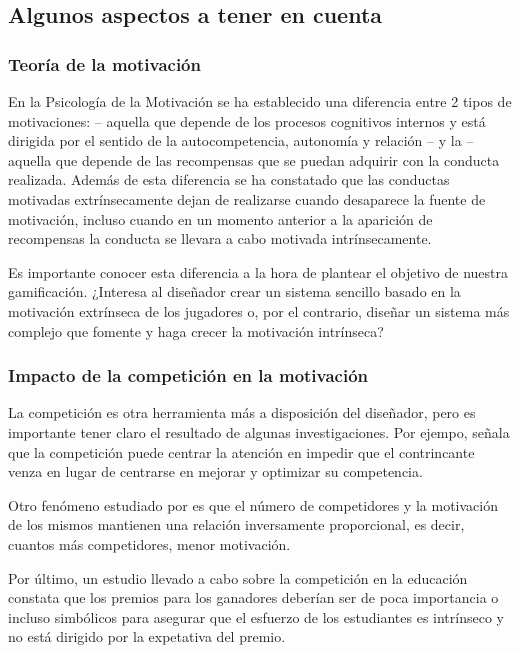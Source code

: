 \subsection{Algunos aspectos a tener en cuenta}

\subsubsection{Teoría de la motivación}
\label{SDT}
En la Psicología de la Motivación se ha establecido una diferencia entre 2 tipos de motivaciones\cite{SDT}:   -- aquella que depende de los procesos cognitivos internos y está dirigida por el sentido de la autocompetencia, autonomía y relación -- y la  -- aquella que depende de las recompensas que se puedan adquirir con la conducta realizada.
%
Además de esta diferencia se ha constatado que las conductas motivadas extrínsecamente dejan de realizarse cuando desaparece la fuente de motivación, incluso cuando en un momento anterior a la aparición de recompensas la conducta se llevara a cabo motivada intrínsecamente.

Es importante conocer esta diferencia a la hora de plantear el objetivo de nuestra gamificación. 
%
¿Interesa al diseñador crear un sistema sencillo basado en la motivación extrínseca de los jugadores o, por el contrario, diseñar un sistema más complejo que fomente y haga crecer la motivación intrínseca?



\subsubsection{Impacto de la competición en la motivación}

\label{PosiblesPeligros}
%
La competición es otra herramienta más a disposición del diseñador, pero es importante tener claro el resultado de algunas investigaciones.
%
Por ejempo, \cite{Crawford_CompetitionDef} señala que la competición puede centrar la atención en impedir que el contrincante venza en lugar de centrarse en mejorar y optimizar su competencia.
%

Otro fenómeno estudiado por \cite{n-effect} es que el número de competidores y la motivación de los mismos mantienen una relación inversamente proporcional, es decir, cuantos más competidores, menor motivación.

Por último, un estudio llevado a cabo sobre la competición en la educación \cite{CompetitionInEd} constata que los premios para los ganadores deberían ser de poca importancia o incluso simbólicos para asegurar que el esfuerzo de los estudiantes es intrínseco y no está dirigido por la expetativa del premio.



